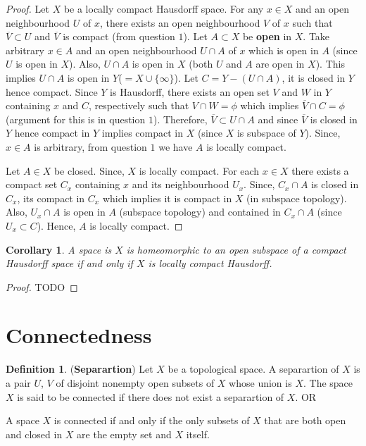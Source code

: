 \documentclass[12pt,reqno]{amsart}
\theoremstyle{plain}
\newtheorem{cor}{Corollary}
\theoremstyle{definition}
\newtheorem{defn}{Definition}
\begin{document}
\begin{proof}
    Let $X$ be a locally compact Hausdorff space. For any $x \in X$ and an open neighbourhood $U$ of $x$, there exists an open neighbourhood $V$ of $x$ such that $\overline{V} \subset U$ and $\overline{V}$ is compact (from question $1$). Let $A \subset X$ be {\bf open} in $X$. Take arbitrary $x \in A$ and an open neighbourhood $U \cap A$ of $x$ which is open in $A$ (since $U$ is open in $X$). Also, $U \cap A$ is open in $X$ (both $U$ and $A$ are open in $X$). This implies $U \cap A$ is open in $Y$($=X \cup \{\infty\}$). Let $C = Y - (U \cap A)$, it is closed in $Y$ hence compact. Since $Y$ is Hausdorff, there exists an open set $V$ and $W$ in $Y$ containing $x$ and $C$, respectively such that $V \cap W = \phi$ which implies $\overline{V} \cap C = \phi$ (argument for this is in question $1$). Therefore, $\overline{V} \subset U \cap A$ and since $\overline{V}$ is closed in $Y$ hence compact in $Y$ implies compact in $X$ (since $X$ is subspace of $Y$). Since, $x \in A$ is arbitrary, from question $1$ we have $A$ is locally compact.

    Let $A \in X$ be closed. Since, $X$ is locally compact. For each $x \in X$ there exists a compact set $C_x$ containing $x$ and its neighbourhood $U_x$. Since, $C_x \cap A$ is closed in $C_x$, its compact in $C_x$ which implies it is compact in $X$ (in subspace topology). Also, $U_x \cap A$ is open in $A$ (subspace topology) and contained in $C_x \cap A$ (since $U_x \subset C$). Hence, $A$ is locally compact.
\end{proof}

\begin{cor}
    A space is $X$ is homeomorphic to an open subspace of a compact Hausdorff space if and only if $X$ is locally compact Hausdorff.
\end{cor}
\begin{proof}
    TODO
\end{proof}

\section{Connectedness}
\begin{defn}({\bf Separartion})
    Let $X$ be a topological space. A separartion of $X$ is a pair $U$, $V$ of disjoint nonempty open subsets of $X$ whose union is $X$. The space $X$ is said to be connected if there does not exist a separartion of $X$. OR

    A space $X$ is connected if and only if the only subsets of $X$ that are both open and closed in $X$ are the empty set and $X$ itself.
\end{defn}
\end{document}
